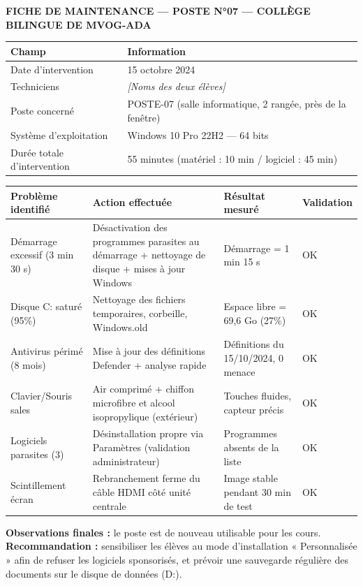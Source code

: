 \documentclass[11pt]{article}
\begin{document}
\begin{exoresolu}
\textbf{FICHE DE MAINTENANCE — POSTE N°07 — COLLÈGE BILINGUE DE MVOG-ADA}\par
\begin{center}
\begin{tabularx}{\linewidth}{|l|X|}
\hline
\rowcolor{poporangeL}
\textbf{Champ} & \textbf{Information} \\
\hline
Date d'intervention & 15 octobre 2024 \\
Techniciens & \textit{[Noms des deux élèves]} \\
Poste concerné & POSTE-07 (salle informatique, 2\up{e} rangée, près de la fenêtre) \\
Système d'exploitation & Windows 10 Pro 22H2 — 64 bits \\
Durée totale d'intervention & 55 minutes (matériel : 10 min / logiciel : 45 min) \\
\hline
\end{tabularx}
\end{center}

\begin{center}
\begin{tabularx}{\linewidth}{|X|X|X|l|}
\hline
\rowcolor{poppurpleL}
\textbf{Problème identifié} & \textbf{Action effectuée} & \textbf{Résultat mesuré} & \textbf{Validation} \\
\hline
Démarrage excessif (3 min 30 s) & Désactivation des programmes parasites au démarrage + nettoyage de disque + mises à jour Windows & Démarrage = 1 min 15 s & OK \\
\hline
Disque C: saturé (95\%) & Nettoyage des fichiers temporaires, corbeille, Windows.old & Espace libre = 69,6 Go (27\%) & OK \\
\hline
Antivirus périmé (8 mois) & Mise à jour des définitions Defender + analyse rapide & Définitions du 15/10/2024, 0 menace & OK \\
\hline
Clavier/Souris sales & Air comprimé + chiffon microfibre et alcool isopropylique (extérieur) & Touches fluides, capteur précis & OK \\
\hline
Logiciels parasites (3) & Désinstallation propre via Paramètres (validation administrateur) & Programmes absents de la liste & OK \\
\hline
Scintillement écran & Rebranchement ferme du câble HDMI côté unité centrale & Image stable pendant 30 min de test & OK \\
\hline
\end{tabularx}
\end{center}
\textbf{Observations finales :} le poste est de nouveau utilisable pour les cours. \textbf{Recommandation :} sensibiliser les élèves au mode d'installation « Personnalisée » afin de refuser les logiciels sponsorisés, et prévoir une sauvegarde régulière des documents sur le disque de données (D:).


\end{exoresolu}
\end{document}
